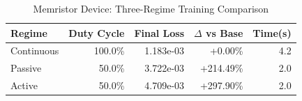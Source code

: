 \begin{table}[htbp]
\centering
\caption{Memristor Device: Three-Regime Training Comparison}
\label{tab:memristor_regimes}
\begin{tabular}{lrrrr}
\hline
Regime & Duty Cycle & Final Loss & $\Delta$ vs Base & Time(s) \\
\hline
Continuous & 100.0\% & 1.183e-03 & +0.00\% & 4.2 \\
Passive & 50.0\% & 3.722e-03 & +214.49\% & 2.0 \\
Active & 50.0\% & 4.709e-03 & +297.90\% & 2.0 \\
\hline
\end{tabular}
\end{table}
